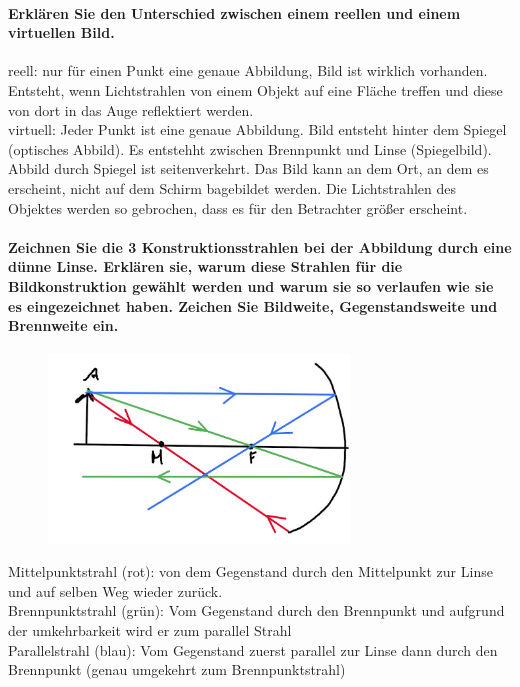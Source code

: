\documentclass[a4paper, 11pt, parskip=half]{scrartcl}
\begin{document}
\paragraph{Erklären Sie den Unterschied zwischen einem reellen und einem virtuellen Bild.}

reell: nur für einen Punkt eine genaue Abbildung, Bild ist wirklich vorhanden. Entsteht, wenn Lichtstrahlen von einem Objekt auf eine Fläche treffen und diese von dort in das Auge reflektiert werden.\\
virtuell: Jeder Punkt ist eine genaue Abbildung. Bild entsteht hinter dem Spiegel (optisches Abbild). Es entstehht zwischen Brennpunkt und Linse (Spiegelbild).  Abbild durch Spiegel ist seitenverkehrt.  Das Bild kann an dem Ort, an dem es erscheint, nicht auf dem Schirm bagebildet werden. Die Lichtstrahlen des Objektes werden so gebrochen, dass es für den Betrachter größer erscheint.

\paragraph{Zeichnen Sie die 3 Konstruktionsstrahlen bei der Abbildung durch eine dünne Linse.
Erklären sie, warum diese Strahlen für die Bildkonstruktion gewählt werden und warum sie so
verlaufen wie sie es eingezeichnet haben. Zeichen Sie Bildweite, Gegenstandsweite und Brennweite
ein.}

\begin{figure}[H]
    \centering
    \includegraphics[width=8cm]{image/17/geo14}
\end{figure}



Mittelpunktstrahl (rot): von dem Gegenstand durch den Mittelpunkt zur Linse und auf selben Weg wieder zurück.\\
Brennpunktstrahl (grün): Vom Gegenstand durch den Brennpunkt und aufgrund der umkehrbarkeit wird er zum parallel Strahl\\
Parallelstrahl (blau): Vom Gegenstand zuerst parallel zur Linse dann durch den Brennpunkt (genau umgekehrt zum Brennpunktstrahl)
\end{document}
